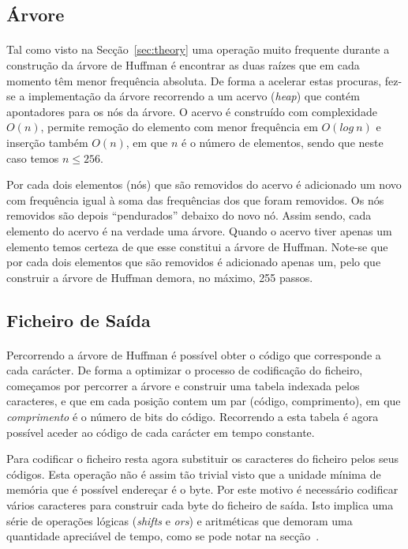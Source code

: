 \documentclass[a4paper]{article}
\begin{document}
	\subsection{Árvore}

	\paragraph{} Tal como visto na Secção~\ref{sec:theory} uma operação muito frequente durante a construção da árvore de Huffman é encontrar as duas raízes que em cada momento têm menor frequência absoluta. De forma a acelerar estas procuras, fez-se a implementação da árvore recorrendo a um acervo (\textit{heap}) que contém apontadores para os nós da árvore. O acervo é construído com complexidade $O(n)$, permite remoção do elemento com menor frequência em $O(log\ n)$ e inserção também $O(n)$, em que $n$ é o número de elementos, sendo que neste caso temos $n \leq 256$.

	Por cada dois elementos (nós) que são removidos do acervo é adicionado um novo com frequência igual à soma das frequências dos que foram removidos. Os nós removidos são depois ``pendurados'' debaixo do novo nó. Assim sendo, cada elemento do acervo é na verdade uma árvore. Quando o acervo tiver apenas um elemento temos certeza de que esse constitui a árvore de Huffman. Note-se que por cada dois elementos que são removidos é adicionado apenas um, pelo que construir a árvore de Huffman demora, no máximo, 255 passos.

	\subsection{Ficheiro de Saída}

	\paragraph{} Percorrendo a árvore de Huffman é possível obter o código que corresponde a cada carácter. De forma a optimizar o processo de codificação do ficheiro, começamos por percorrer a árvore e construir uma tabela indexada pelos caracteres, e que em cada posição contem um par (código, comprimento), em que \emph{comprimento} é o número de bits do código. Recorrendo a esta tabela é agora possível aceder ao código de cada carácter em tempo constante.

	Para codificar o ficheiro resta agora substituir os caracteres do ficheiro pelos seus códigos. Esta operação não é assim tão trivial visto que a unidade mínima de memória que é possível endereçar é o byte. Por este motivo é necessário codificar vários caracteres para construir cada byte do ficheiro de saída. Isto implica uma série de operações lógicas (\textit{shifts} e \textit{ors}) e aritméticas que demoram uma quantidade apreciável de tempo, como se pode notar na secção~.
\end{document}
